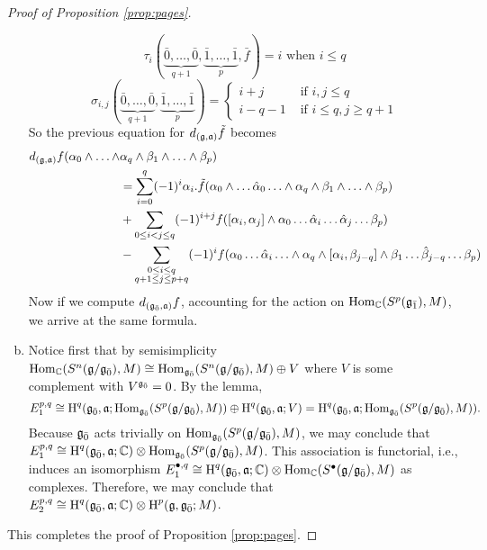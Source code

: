 \begin{proof}[Proof of Proposition \ref{prop:pages}]
\begin{enumerate}[(a)]
\[
  \tau_i(\underbrace{\bar 0,\ldots,\bar 0}_{q+1},\underbrace{\bar 1,\ldots,\bar 1}_p,\bar f) = i \text{ when } i \leq q
\]
\[
    \sigma_{i,j}(\underbrace{\bar 0,\ldots,\bar 0}_{q+1},\underbrace{\bar 1,\ldots,\bar 1}_p) = \begin{cases}
      i + j &\text{ if } i,j \leq q \\
      i - q - 1 &\text{ if } i \leq q, j \geq q+1
    \end{cases}
 \]
So the previous equation for $d_{(\mathfrak{g},\mathfrak{a})}\tilde f$ becomes
  \begin{align}\begin{split}
    d_{(\mathfrak{g},\mathfrak{a})}f(\alpha_0\wedge \ldots \wedge& \alpha_q \wedge \beta_1 \wedge \ldots \wedge \beta_p)\\ &= \sum_{i = 0}^q (-1)^{i} \alpha_i.\tilde{f}(\alpha_0\wedge \ldots \hat \alpha_0 \ldots \wedge \alpha_q \wedge \beta_1 \wedge \ldots \wedge \beta_p) \\
                                                                                                    &+ \sum_{0 \leq i < j \leq q} (-1)^{i+j}f([\alpha_i,\alpha_j] \wedge \alpha_0 \ldots \hat \alpha_i \ldots \hat \alpha_j \ldots \beta_p) \\
                                                                                                    &- \sum_{\substack{0 \leq i \leq q \\ q+1 \leq j \leq p+q}} (-1)^{i} f(\alpha_0 \ldots \hat \alpha_i \ldots \wedge \alpha_q \wedge [\alpha_i,\beta_{j-q}] \wedge \beta_1\ldots \hat \beta_{j-q} \ldots \beta_p) \\
  \end{split}\end{align}
  Now if we compute $d_{({\mathfrak{g}}_{\bar{0}},\mathfrak{a})}f$, accounting for the action on $\operatorname{Hom}_{\mathbb{C}}(S^p({\mathfrak{g}}_{\bar{1}}),M)$, we arrive at the same formula.
\item Notice first that by semisimplicity $\operatorname{Hom}_{\mathbb{C}}(S^n(\mathfrak{g}/{\mathfrak{g}}_{\bar{0}}),M) \cong \operatorname{Hom}_{{\mathfrak{g}}_{\bar{0}}}(S^n(\mathfrak{g}/{\mathfrak{g}}_{\bar{0}}),M) \oplus V$ where $V$ is some complement with $V^{{\mathfrak{g}}_{\bar{0}}} = 0$. By the lemma,
  \[
    E_1^{p,q} \cong \operatorname{H}^q({\mathfrak{g}}_{\bar{0}},\mathfrak{a};\operatorname{Hom}_{{\mathfrak{g}}_{\bar{0}}}(S^p(\mathfrak{g}/{\mathfrak{g}}_{\bar{0}}),M)) \oplus \operatorname{H}^q({\mathfrak{g}}_{\bar{0}},\mathfrak{a};V) = \operatorname{H}^q({\mathfrak{g}}_{\bar{0}},\mathfrak{a};\operatorname{Hom}_{{\mathfrak{g}}_{\bar{0}}}(S^p(\mathfrak{g}/{\mathfrak{g}}_{\bar{0}}),M)).
  \]
  Because ${\mathfrak{g}}_{\bar{0}}$ acts trivially on $\operatorname{Hom}_{{\mathfrak{g}}_{\bar{0}}}(S^p(\mathfrak{g}/{\mathfrak{g}}_{\bar{0}}),M)$, we may conclude that $E_1^{p,q} \cong \operatorname{H}^q({\mathfrak{g}}_{\bar{0}},\mathfrak{a};\mathbb{C}) \otimes \operatorname{Hom}_{{\mathfrak{g}}_{\bar{0}}}(S^p(\mathfrak{g}/{\mathfrak{g}}_{\bar{0}}),M)$. This association is functorial, i.e., induces an isomorphism $E_1^{\bullet,q} \cong \operatorname{H}^q({\mathfrak{g}}_{\bar{0}},\mathfrak{a};\mathbb{C}) \otimes \operatorname{Hom}_{\mathbb{C}}(S^\bullet(\mathfrak{g}/{\mathfrak{g}}_{\bar{0}}),M)$ as complexes. Therefore, we may conclude that $E_2^{p,q} \cong \operatorname{H}^q({\mathfrak{g}}_{\bar{0}},\mathfrak{a};\mathbb{C}) \otimes \operatorname{H}^p(\mathfrak{g},{\mathfrak{g}}_{\bar{0}};M)$.
\end{enumerate}
This completes the proof of Proposition \ref{prop:pages}.
\end{proof}

